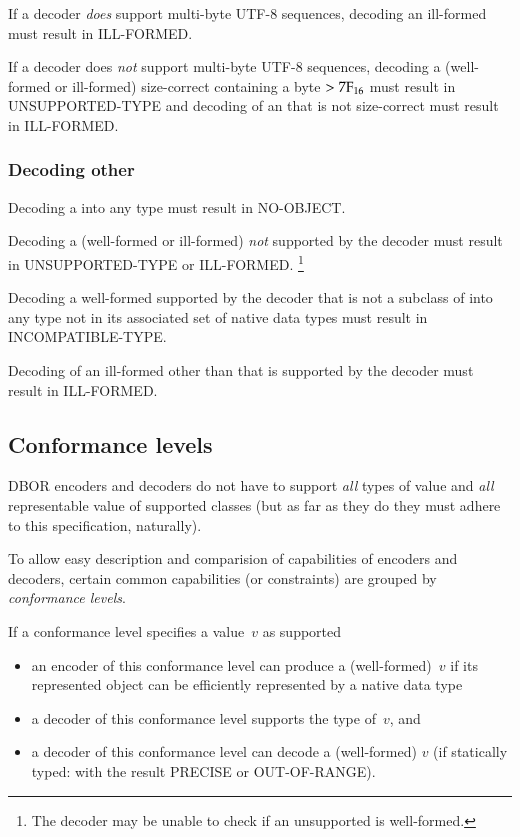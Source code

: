 \medskip
If a decoder \emph{does} support multi-byte UTF-8 sequences,
decoding an ill-formed \DborUtfEightStringValue{} must result in ILL-FORMED.

\medskip
If a decoder does \emph{not} support multi-byte UTF-8 sequences,
decoding a (well-formed or ill-formed) size-correct \DborUtfEightStringValue{} containing a byte $> \mathrm{7F}_{16}$
must result in UNSUPPORTED-TYPE and
decoding of an \DborUtfEightStringValue{} that is not size-correct must result in ILL-FORMED.


\subsubsection{Decoding other \DborValue}

Decoding a \DborNoneValue{} into any type must result in NO-OBJECT.

\medskip
Decoding a (well-formed or ill-formed) \DborValue{} \emph{not} supported by the decoder
must result in UNSUPPORTED-TYPE or ILL-FORMED.%
\footnote{%
    The decoder may be unable to check if an unsupported \DborValue{} is well-formed.
}

\medskip
Decoding a well-formed \DborValue{} supported by the decoder that is not a subclass of \DborNumberValue{}
into any type not in its associated set of native data types must result in INCOMPATIBLE-TYPE.

\medskip
Decoding of an ill-formed \DborValue{} other than \DborUtfEightStringValue{}
that is supported by the decoder must result in ILL-FORMED.


\subsection{Conformance levels}
\label{sec:conformancelevels}

DBOR encoders and decoders do not have to support \emph{all} types of value and \emph{all} representable value
of supported classes (but as far as they do they must adhere to this specification, naturally).

To allow easy description and comparision of capabilities of encoders and decoders,
certain common capabilities (or constraints) are grouped by \emph{conformance levels}.

If a conformance level specifies a value~$v$ as supported
\begin{itemize}
    \item
    an encoder of this conformance level can produce a (well-formed)~$v$ if its represented object can be
    efficiently represented by a native data type

    \item
    a decoder of this conformance level supports the type of~$v$, and

    \item
    a decoder of this conformance level can decode a (well-formed) $v$
    (if statically typed: with the result PRECISE or OUT-OF-RANGE).
\end{itemize}

